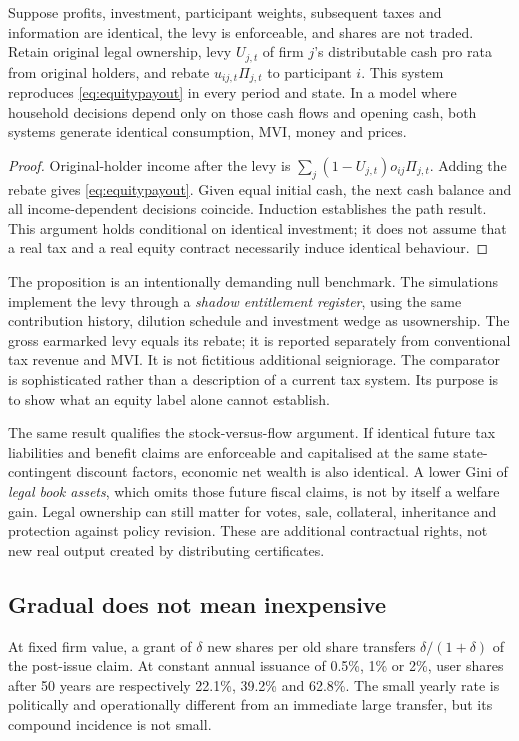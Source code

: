 \begin{proposition}\label{prop:equivalence}
Suppose profits, investment, participant weights, subsequent taxes and information are identical, the levy is enforceable, and shares are not traded. Retain original legal ownership, levy $U_{j,t}$ of firm $j$'s distributable cash pro rata from original holders, and rebate $u_{ij,t}\Pi_{j,t}$ to participant $i$. This system reproduces \eqref{eq:equitypayout} in every period and state. In a model where household decisions depend only on those cash flows and opening cash, both systems generate identical consumption, MVI, money and prices.
\end{proposition}
\begin{proof}
Original-holder income after the levy is $\sum_j(1-U_{j,t})o_{ij}\Pi_{j,t}$. Adding the rebate gives \eqref{eq:equitypayout}. Given equal initial cash, the next cash balance and all income-dependent decisions coincide. Induction establishes the path result. This argument holds conditional on identical investment; it does not assume that a real tax and a real equity contract necessarily induce identical behaviour.
\end{proof}

The proposition is an intentionally demanding null benchmark. The simulations implement the levy through a \emph{shadow entitlement register}, using the same contribution history, dilution schedule and investment wedge as usownership. The gross earmarked levy equals its rebate; it is reported separately from conventional tax revenue and MVI. It is not fictitious additional seigniorage. The comparator is sophisticated rather than a description of a current tax system. Its purpose is to show what an equity label alone cannot establish.

The same result qualifies the stock-versus-flow argument. If identical future tax liabilities and benefit claims are enforceable and capitalised at the same state-contingent discount factors, economic net wealth is also identical. A lower Gini of \emph{legal book assets}, which omits those future fiscal claims, is not by itself a welfare gain. Legal ownership can still matter for votes, sale, collateral, inheritance and protection against policy revision. These are additional contractual rights, not new real output created by distributing certificates.

\subsection{Gradual does not mean inexpensive}
At fixed firm value, a grant of $\delta$ new shares per old share transfers $\delta/(1+\delta)$ of the post-issue claim. At constant annual issuance of 0.5\%, 1\% or 2\%, user shares after 50 years are respectively 22.1\%, 39.2\% and 62.8\%. The small yearly rate is politically and operationally different from an immediate large transfer, but its compound incidence is not small.

